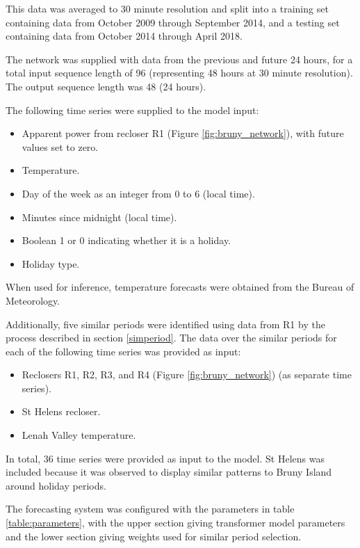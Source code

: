 This data was averaged to 30 minute resolution and split into a training set containing data from October 2009 through September 2014, and a testing set containing data from October 2014 through April 2018.

The network was supplied with data from the previous and future 24 hours, for a total input sequence length of 96 (representing 48 hours at 30 minute resolution).
The output sequence length was 48 (24 hours).

The following time series were supplied to the model input:
\begin{itemize}
	\item Apparent power from recloser R1 (Figure \ref{fig:bruny_network}), with future values set to zero.
	\item Temperature.
	\item Day of the week as an integer from 0 to 6 (local time).
	\item Minutes since midnight (local time).
	\item Boolean 1 or 0 indicating whether it is a holiday.
	\item Holiday type.
\end{itemize}

When used for inference, temperature forecasts were obtained from the Bureau of Meteorology.

Additionally, five similar periods were identified using data from R1 by the process described in section \ref{simperiod}.
The data over the similar periods for each of the following time series was provided as input:
\begin{itemize}
	\item Reclosers R1, R2, R3, and R4 (Figure \ref{fig:bruny_network}) (as separate time series).
	\item St Helens recloser.
	\item Lenah Valley temperature.
\end{itemize}

In total, 36 time series were provided as input to the model.
St Helens was included because it was observed to display similar patterns to Bruny Island around holiday periods.

The forecasting system was configured with the parameters in table \ref{table:parameters}, with the upper section giving transformer model parameters and the lower section giving weights used for similar period selection.

